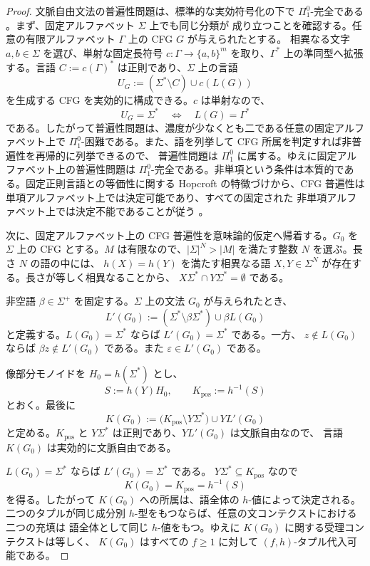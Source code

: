 \documentclass[11pt,a4paper]{ltjsarticle}
\theoremstyle{remark}
\newcommand{\eps}{\varepsilon}
\begin{document}
\begin{proof}
文脈自由文法の普遍性問題は、標準的な実効符号化の下で \(\Pi^0_1\)-完全である
\cite{DomaratzkiOkhotinShallit2007}。まず、固定アルファベット \(\Sigma\) 上でも同じ分類が
成り立つことを確認する。任意の有限アルファベット \(\Gamma\) 上の CFG \(G\) が与えられたとする。
相異なる文字 \(a,b\in\Sigma\) を選び、単射な固定長符号
\(c:\Gamma\to\{a,b\}^m\) を取り、\(\Gamma^*\) 上の準同型へ拡張する。言語
\(C:=c(\Gamma)^*\) は正則であり、\(\Sigma\) 上の言語
\[
  U_G:=(\Sigma^*\setminus C)\cup c(L(G))
\]
を生成する CFG を実効的に構成できる。\(c\) は単射なので、
\[
  U_G=\Sigma^*
  \quad\Longleftrightarrow\quad
  L(G)=\Gamma^*
\]
である。したがって普遍性問題は、濃度が少なくとも二である任意の固定アルファベット上で
\(\Pi^0_1\)-困難である。また、語を列挙して CFG 所属を判定すれば非普遍性を再帰的に列挙できるので、
普遍性問題は \(\Pi^0_1\) に属する。ゆえに固定アルファベット上の普遍性問題は
\(\Pi^0_1\)-完全である。非単項という条件は本質的である。固定正則言語との等価性に関する
Hopcroft の特徴づけから、CFG 普遍性は単項アルファベット上では決定可能であり、すべての固定された
非単項アルファベット上では決定不能であることが従う \cite{Hopcroft1969}。

次に、固定アルファベット上の CFG 普遍性を意味論的仮定へ帰着する。\(G_0\) を \(\Sigma\) 上の
CFG とする。\(M\) は有限なので、\(|\Sigma|^N>|M|\) を満たす整数 \(N\) を選ぶ。長さ \(N\) の語の中には、
\(h(X)=h(Y)\) を満たす相異なる語 \(X,Y\in\Sigma^N\) が存在する。長さが等しく相異なることから、
\(X\Sigma^*\cap Y\Sigma^*=\emptyset\) である。

非空語 \(\beta\in\Sigma^+\) を固定する。\(\Sigma\) 上の文法 \(G_0\) が与えられたとき、
\[
  L'(G_0):=(\Sigma^*\setminus \beta\Sigma^*)\cup \beta L(G_0)
\]
と定義する。\(L(G_0)=\Sigma^*\) ならば \(L'(G_0)=\Sigma^*\) である。一方、
\(z\notin L(G_0)\) ならば \(\beta z\notin L'(G_0)\) である。また
\(\eps\in L'(G_0)\) である。

像部分モノイドを \(H_0=h(\Sigma^*)\) とし、
\[
  S:=h(Y)H_0,
  \qquad K_{\mathrm{pos}}:=h^{-1}(S)
\]
とおく。最後に
\[
  K(G_0):=\bigl(K_{\mathrm{pos}}\setminus Y\Sigma^*\bigr)\cup YL'(G_0)
\]
と定める。\(K_{\mathrm{pos}}\) と \(Y\Sigma^*\) は正則であり、\(YL'(G_0)\) は文脈自由なので、
言語 \(K(G_0)\) は実効的に文脈自由である。

\(L(G_0)=\Sigma^*\) ならば \(L'(G_0)=\Sigma^*\) である。
\(Y\Sigma^*\subseteq K_{\mathrm{pos}}\) なので
\[
  K(G_0)=K_{\mathrm{pos}}=h^{-1}(S)
\]
を得る。したがって \(K(G_0)\) への所属は、語全体の \(h\)-値によって決定される。
二つのタプルが同じ成分別 \(h\)-型をもつならば、任意の文コンテクストにおける二つの充填は
語全体として同じ \(h\)-値をもつ。ゆえに \(K(G_0)\) に関する受理コンテクストは等しく、
\(K(G_0)\) はすべての \(f\ge1\) に対して \((f,h)\)-タプル代入可能である。


\end{proof}
\end{document}
